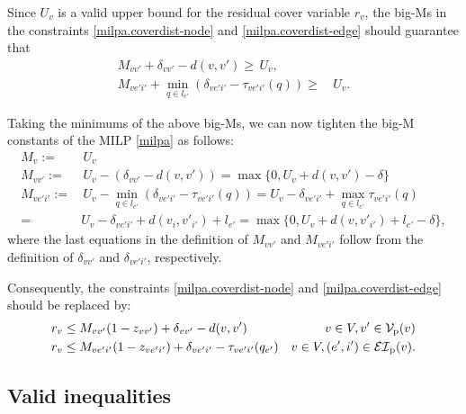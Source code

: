 Since $U_v$ is a valid upper bound for the residual cover variable $r_v$, the big-Ms in the constraints \eqref{milpa.coverdist-node} and \eqref{milpa.coverdist-edge} should guarantee that
\begin{equation*}
\begin{split}
	M_{vv'}+ \delta_{vv'} - d(v,v') \ge\, U_v,\\
  M_{ve'i'}+ \min_{q \in l_{e'}}(\delta_{ve'i'}-\tau_{ve'i'}(q)) \ge &\, U_v.
\end{split}
\end{equation*}

Taking the minimums of the above big-Ms, we can now tighten the big-M constants of the MILP \eqref{milpa} as follows:
\begin{equation}
\begin{split}
	M_{v}:=&\, U_v \\
	M_{vv'}:= &\, U_v - (\delta_{vv'} - d(v,v')) = \max \{0, U_v+d(v,v')-\delta\}\\
  M_{ve'i'}:= &\, U_v - \min_{q \in l_{e'}}(\delta_{ve'i'}-\tau_{ve'i'}(q))
   = U_v - \delta_{ve'i'} + \max_{q \in l_{e'}} \tau_{ve'i'}(q) \\
  =& U_v - \delta_{ve'i'} + d(v_i,v'_{i'})+l_{e'}
  =  \max \{0, U_v+d(v,v'_{i'})+l_{e'}-\delta\}, \nonumber
\end{split}
\end{equation}
where the last equations in the definition of $M_{vv'}$ and $M_{ve'i'}$ follow from the definition of $\delta_{vv'}$ and $\delta_{ve'i'}$, respectively.


Consequently, the constraints \eqref{milpa.coverdist-node} and \eqref{milpa.coverdist-edge}  should be replaced by:
\begin{subequations}
	\begin{align}
    	&   r_{v} \le M_{vv'}(1 - z_{vv'})  +  \delta_{vv'} - d(v,v') & v \in V ,  v' \in \mathcal V_{\mathrm{p}}(v) \label{milpa.coverdist-node_ref} \\
 &   r_{v} \le M_{ve'i'}(1 - z_{ve'{i'}})  +  \delta_{ve'i'} - \tau_{ve'i'}(q_{e'}) & v \in V ,  (e',i') \in {\mathcal {EI}}_{\mathrm{p}}(v). \label{milpa.coverdist-edge_ref}
	\end{align}
\end{subequations}

\subsection{Valid inequalities}\label{sec:valid-ineq}

